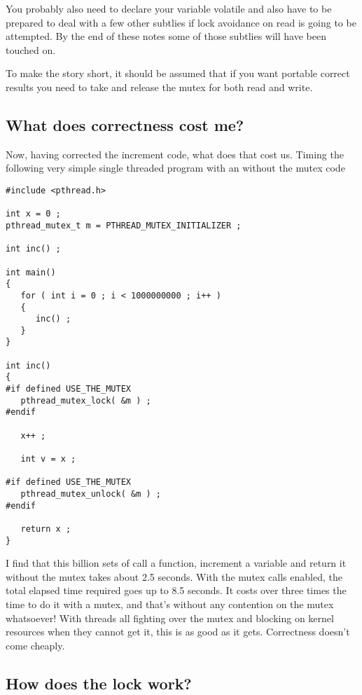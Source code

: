 You probably also need to declare your variable volatile and also have to be prepared to deal with a few other subtlies if lock avoidance on read is going to be attempted.  By the end of these notes some of those subtlies will have been touched on.

To make the story short, it should be assumed that if you want portable correct results you need to take and release the mutex for both read and write.

\subsection{What does correctness cost me?}

Now, having corrected the increment code, what does that cost us.  Timing the following very simple single threaded program with an without the mutex code

\begin{lstlisting}
#include <pthread.h>

int x = 0 ;
pthread_mutex_t m = PTHREAD_MUTEX_INITIALIZER ;

int inc() ;

int main()
{
   for ( int i = 0 ; i < 1000000000 ; i++ )
   {
      inc() ;
   }
}

int inc()
{
#if defined USE_THE_MUTEX
   pthread_mutex_lock( &m ) ;
#endif

   x++ ;

   int v = x ;

#if defined USE_THE_MUTEX
   pthread_mutex_unlock( &m ) ;
#endif

   return x ;
}
\end{lstlisting}

I find that this billion sets of call a function, increment a variable and return it without the mutex takes about 2.5 seconds.  With the mutex calls enabled, the total elapsed time required goes up to 8.5 seconds.  It costs over three times the time to do it with a mutex, and that's without any contention on the mutex whatsoever!  With threads all fighting over the mutex and blocking on kernel resources when they cannot get it, this is as good as it gets.  Correctness doesn't come cheaply.

\subsection{How does the lock work?}

